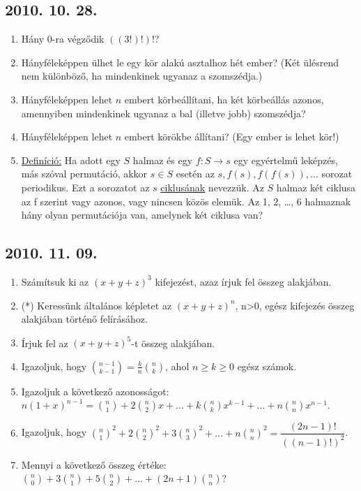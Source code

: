 \documentclass{article}
\begin{document}
\subsection*{2010. 10. 28.}
\begin{enumerate}
\item Hány $0$-ra végződik $((3!)!)!$?
\item Hányféleképpen ülhet le egy kör alakú asztalhoz hét ember? (Két ülésrend nem különböző, ha mindenkinek ugyanaz a szomszédja.)
\item Hányféleképpen lehet $n$ embert körbeállítani, ha két körbeállás azonos, amennyiben mindenkinek ugyanaz a bal (illetve jobb) szomszédja?
\item Hányféleképpen lehet $n$ embert körökbe állítani? (Egy ember is lehet kör!)
\item \underline{Definíció:} Ha adott egy $S$ halmaz és egy $f: S\rightarrow{s}$ egy egyértelmű leképzés, más szóval permutáció, akkor $s{\in}S$ esetén az $s, f(s), f(f(s)),\dots$ sorozat periodikus. Ezt a sorozatot az $s$ \underline{ciklusának} nevezzük. Az $S$ halmaz két ciklusa az f szerint  vagy azonos, vagy nincsen közös elemük. Az {{1, 2, \dots, 6}} halmaznak hány olyan permutációja van, amelynek két ciklusa van?
\end{enumerate}


\subsection*{2010. 11. 09.}
\begin{enumerate}
\item Számítsuk ki az $(x+y+z)^{3}$ kifejezést, azaz írjuk fel összeg alakjában.
\item (*) Keressünk általános képletet az $(x+y+z)^{n}$, n>0, egész kifejezés összeg alakjában történő felírásához.
\item Írjuk fel az $(x+y+z)^{5}$-t összeg alakjában.
\item Igazoljuk, hogy $\binom{n-1}{k-1}=\frac{k}{n}\binom{n}{k} $, ahol $n\ge{k}\ge{0}$ egész számok.
\item Igazoljuk a következő azonosságot: $n(1+x)^{n-1} = \binom{n}{1}+2\binom{n}{2}x+\dots+k\binom{n}{k}x^{k-1}+\dots+n\binom{n}{n}x^{n-1}$.
\item Igazoljuk, hogy ${\binom{n}{1}}^{2}+2{\binom{n}{2}}^{2}+3{\binom{n}{3}}^{2}+\dots+n{\binom{n}{n}}^{2}=\dfrac{(2n-1)!}{((n-1)!)^{2}}$.
\item Mennyi a következő összeg értéke: $\binom{n}{0}+3\binom{n}{1}+5\binom{n}{2}+\dots+(2n+1)\binom{n}{n}$?
\end{enumerate}
\end{document}
